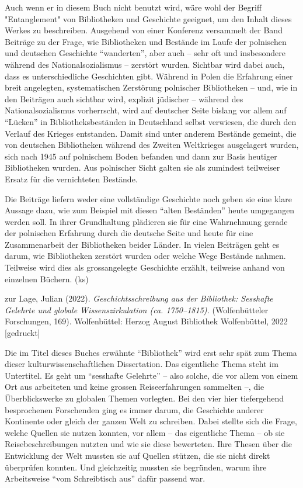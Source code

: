 \documentclass[a4paper,
fontsize=11pt,
oneside,
numbers=noperiodatend,
parskip=half-,
bibliography=totoc,
final
]{scrartcl}
\begin{document}
Auch wenn er in diesem Buch nicht benutzt wird, wäre wohl der Begriff
"Entanglement" von Bibliotheken und Geschichte geeignet, um den Inhalt
dieses Werkes zu beschreiben. Ausgehend von einer Konferenz versammelt
der Band Beiträge zu der Frage, wie Bibliotheken und Bestände im Laufe
der polnischen und deutschen Geschichte \enquote{wanderten}, aber auch
-- sehr oft und insbesondere während des Nationalsozialismus -- zerstört
wurden. Sichtbar wird dabei auch, dass es unterschiedliche Geschichten
gibt. Während in Polen die Erfahrung einer breit angelegten,
systematischen Zerstörung polnischer Bibliotheken -- und, wie in den
Beiträgen auch sichtbar wird, explizit jüdischer -- während des
Nationalsozialismus vorherrscht, wird auf deutscher Seite bislang vor
allem auf \enquote{Lücken} in Bibliotheksbeständen in Deutschland selbst
verwiesen, die durch den Verlauf des Krieges entstanden. Damit sind
unter anderem Bestände gemeint, die von deutschen Bibliotheken während
des Zweiten Weltkrieges ausgelagert wurden, sich nach 1945 auf
polnischem Boden befanden und dann zur Basis heutiger Bibliotheken
wurden. Aus polnischer Sicht galten sie als zumindest teilweiser Ersatz
für die vernichteten Bestände.

Die Beiträge liefern weder eine vollständige Geschichte noch geben sie
eine klare Aussage dazu, wie zum Beispiel mit diesen \enquote{alten
Beständen} heute umgegangen werden soll. In ihrer Grundhaltung plädieren
sie für eine Wahrnehmung gerade der polnischen Erfahrung durch die
deutsche Seite und heute für eine Zusammenarbeit der Bibliotheken beider
Länder. In vielen Beiträgen geht es darum, wie Bibliotheken zerstört
wurden oder welche Wege Bestände nahmen. Teilweise wird dies als
grossangelegte Geschichte erzählt, teilweise anhand von einzelnen
Büchern. (ks)

zur Lage, Julian (2022). \emph{Geschichtsschreibung aus der Bibliothek:
Sesshafte Gelehrte und globale Wissenszirkulation (ca. 1750--1815).}
(Wolfenbütteler Forschungen, 169). Wolfenbüttel: Herzog August
Bibliothek Wolfenbüttel, 2022 {[}gedruckt{]}

Die im Titel dieses Buches erwähnte \enquote{Bibliothek} wird erst sehr
spät zum Thema dieser kulturwissenschaftlichen Dissertation. Das
eigentliche Thema steht im Untertitel. Es geht um \enquote{sesshafte
Gelehrte} -- also solche, die vor allem von einem Ort aus arbeiteten und
keine grossen Reiseerfahrungen sammelten --, die Überblickswerke zu
globalen Themen vorlegten. Bei den vier hier tiefergehend besprochenen
Forschenden ging es immer darum, die Geschichte anderer Kontinente oder
gleich der ganzen Welt zu schreiben. Dabei stellte sich die Frage,
welche Quellen sie nutzen konnten, vor allem -- das eigentliche Thema --
ob sie Reisebeschreibungen nutzten und wie sie diese bewerteten. Ihre
Thesen über die Entwicklung der Welt mussten sie auf Quellen stützen,
die sie nicht direkt überprüfen konnten. Und gleichzeitig mussten sie
begründen, warum ihre Arbeitsweise \enquote{vom Schreibtisch aus} dafür
passend war.
\end{document}
